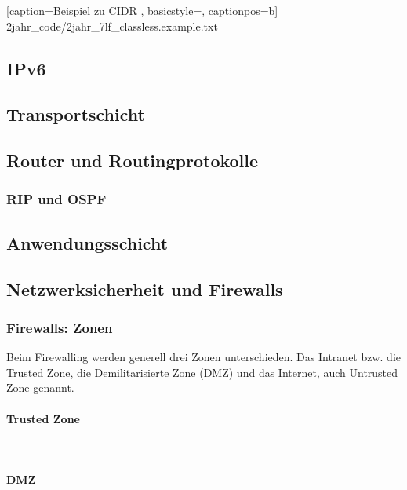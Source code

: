 
	[caption={Beispiel zu CIDR}
	\label{lst:7lf_classless.example},
	basicstyle=\small,
	captionpos=b]
	{2jahr_code/2jahr_7lf_classless.example.txt}
	


\subsection{IPv6}

\subsection{Transportschicht}

\subsection{Router und Routingprotokolle}
\subsubsection{RIP und OSPF}

\subsection{Anwendungsschicht}

\subsection{Netzwerksicherheit und Firewalls}



\subsubsection{Firewalls: Zonen}

Beim Firewalling werden generell drei Zonen unterschieden. Das Intranet bzw. die Trusted Zone, die Demilitarisierte Zone (DMZ) und das Internet, auch Untrusted Zone genannt.

\paragraph{Trusted Zone}~\\
\paragraph{DMZ}~\\
